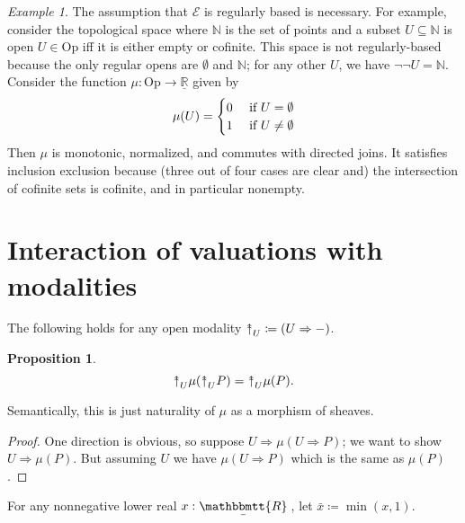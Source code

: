 \documentclass[11pt, oneside, article]{memoir}
\theoremstyle{plain}
\newtheorem{proposition}[theorem]{Proposition}
\theoremstyle{definition}
\theoremstyle{remark}
\newtheorem{example}[theorem]{Example}
\renewcommand{\ss}{\subseteq}
\newcommand{\Set}[1]{\mathrm{#1}}
\newcommand{\cat}[1]{\mathcal{#1}}
\newcommand{\tn}[1]{\textnormal{#1}}
\newcommand{\ul}[1]{\underline{#1}}
\newcommand{\ubar}[1]{\underaccent{\bar}{#1}}
\newcommand{\internal}[1]{\raisebox{-.03ex}{$\mathbbmtt{#1}$}}
\newcommand{\hs}{\hspace{1.1pt}}
\newcommand{\NN}{\mathbb{N}}
\newcommand{\LR}{\ul{\mathbb{R}}}
\newcommand{\tRR}{\internal{R}\hs}
\newcommand{\tLR}{\ubar{\tRR}\hs}
\newcommand{\Op}{\Set{Op}}
\newcommand{\InSymbol}{{\upclose}}%
\newcommand{\In}[2][]{\InSymbol^{#1}_{#2}}
\newcommand{\upclose}{{\rotatebox[origin=c]{90}{$\twoheadrightarrow$}}}
\newcommand{\imp}{\Rightarrow}
\begin{document}
\begin{example}
The assumption that $\cat{E}$ is regularly based is necessary. For example, consider the topological space where $\NN$ is the set of points and a subset $U\ss\NN$ is open $U\in \Op$ iff it is either empty or cofinite. This space is not regularly-based because the only regular opens are $\emptyset$ and $\NN$; for any other $U$, we have $\neg\neg U=\NN$. Consider the function $\mu\colon\Op\to\LR$ given by
\[\mu(U)=\begin{cases}0&\tn{ if }U=\emptyset\\1&\tn{ if }U\neq\emptyset\end{cases}\]
Then $\mu$ is monotonic, normalized, and commutes with directed joins. It satisfies inclusion exclusion because (three out of four cases are clear and) the intersection of cofinite sets is cofinite, and in particular nonempty.
\end{example}



\section{Interaction of valuations with modalities}

The following holds for any open modality $\In{U}\coloneqq (U\imp -)$.
\begin{proposition}\label{prop.In_probability_valuation}
\[\In{U}\mu(\In{U}P)=\In{U}\mu(P).\]
\end{proposition}
Semantically, this is just naturality of $\mu$ as a morphism of sheaves.
\begin{proof}
One direction is obvious, so suppose $U\imp\mu(U\imp P)$; we want to show $U\imp\mu(P)$. But assuming $U$ we have $\mu(U\imp P)$ which is the same as $\mu(P)$.
\end{proof}

For any nonnegative lower real $x:\tLR$, let $\bar{x}\coloneqq\min(x,1)$.
\end{document}
